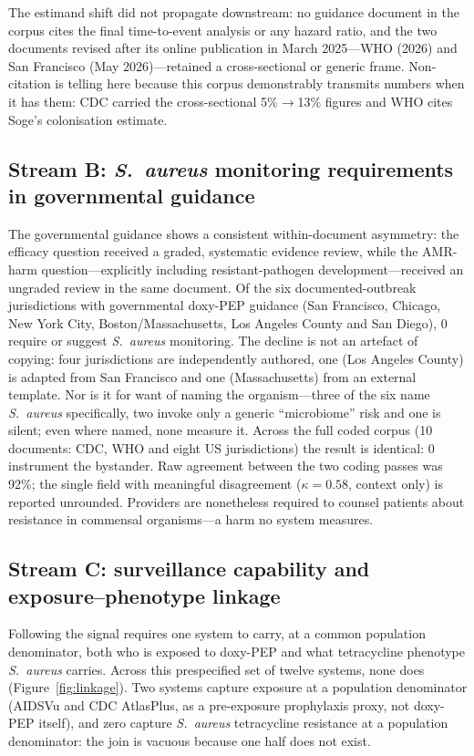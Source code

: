 \documentclass[12pt,a4paper]{article}
\newcommand{\sa}{\emph{S.~aureus}}
\begin{document}
The estimand shift did not propagate downstream: no guidance document in the
corpus cites the final time-to-event analysis or any hazard ratio, and the two
documents revised after its online publication in March 2025---WHO (2026) and San
Francisco (May 2026)---retained a cross-sectional or generic frame. Non-citation
is telling here because this corpus demonstrably transmits numbers when it has
them: CDC carried the cross-sectional 5\%$\rightarrow$13\% figures and WHO cites
Soge's colonisation estimate.\cite{soge2025}

\subsection*{Stream B: \sa{} monitoring requirements in governmental guidance}
The governmental guidance shows a consistent within-document asymmetry: the
efficacy question received a graded, systematic evidence review, while the
AMR-harm question---explicitly including resistant-pathogen development---received
an ungraded review in the same document. Of the six documented-outbreak
jurisdictions with governmental doxy-PEP guidance (San Francisco, Chicago, New
York City, Boston/Massachusetts, Los Angeles County and San Diego), 0 require or
suggest \sa{} monitoring. The decline is not an artefact of copying: four
jurisdictions are independently authored, one (Los Angeles County) is adapted
from San Francisco and one (Massachusetts) from an external template. Nor is it
for want of naming the organism---three of the six name \sa{} specifically, two
invoke only a generic ``microbiome'' risk and one is silent; even where named,
none measure it. Across the full coded corpus (10 documents: CDC, WHO and eight
US jurisdictions) the result is identical: 0 instrument the bystander. Raw
agreement between the two coding passes was 92\%; the single field with meaningful
disagreement ($\kappa=0.58$, context only) is reported unrounded. Providers are nonetheless required to counsel patients about
resistance in commensal organisms---a harm no system measures.

\subsection*{Stream C: surveillance capability and exposure--phenotype linkage}
Following the signal requires one system to carry, at a common population
denominator, both who is exposed to doxy-PEP and what tetracycline phenotype \sa{}
carries. Across this prespecified set of twelve systems, none does
(Figure~\ref{fig:linkage}). Two systems capture exposure at a population
denominator (AIDSVu and CDC AtlasPlus, as a pre-exposure prophylaxis proxy, not
doxy-PEP itself),\cite{aidsvu} and zero capture \sa{} tetracycline resistance at a
population denominator: the join is vacuous because one half does not exist.
\end{document}
